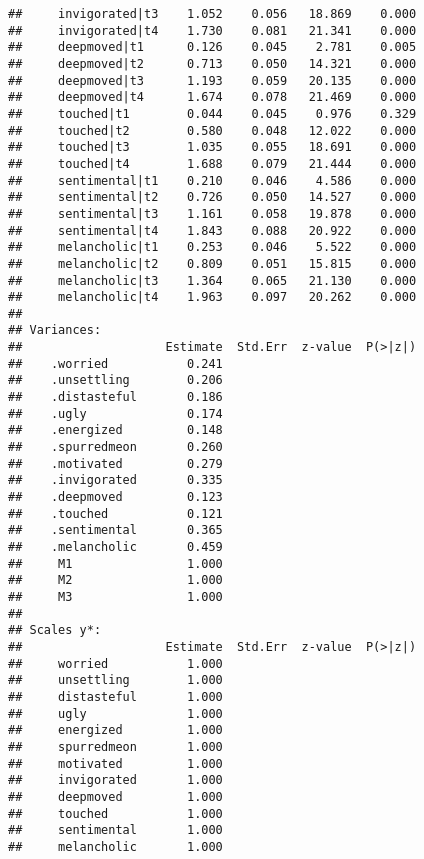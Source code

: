 \documentclass[
]{article}
\begin{document}
\begin{verbatim}
##     invigorated|t3    1.052    0.056   18.869    0.000
##     invigorated|t4    1.730    0.081   21.341    0.000
##     deepmoved|t1      0.126    0.045    2.781    0.005
##     deepmoved|t2      0.713    0.050   14.321    0.000
##     deepmoved|t3      1.193    0.059   20.135    0.000
##     deepmoved|t4      1.674    0.078   21.469    0.000
##     touched|t1        0.044    0.045    0.976    0.329
##     touched|t2        0.580    0.048   12.022    0.000
##     touched|t3        1.035    0.055   18.691    0.000
##     touched|t4        1.688    0.079   21.444    0.000
##     sentimental|t1    0.210    0.046    4.586    0.000
##     sentimental|t2    0.726    0.050   14.527    0.000
##     sentimental|t3    1.161    0.058   19.878    0.000
##     sentimental|t4    1.843    0.088   20.922    0.000
##     melancholic|t1    0.253    0.046    5.522    0.000
##     melancholic|t2    0.809    0.051   15.815    0.000
##     melancholic|t3    1.364    0.065   21.130    0.000
##     melancholic|t4    1.963    0.097   20.262    0.000
## 
## Variances:
##                    Estimate  Std.Err  z-value  P(>|z|)
##    .worried           0.241                           
##    .unsettling        0.206                           
##    .distasteful       0.186                           
##    .ugly              0.174                           
##    .energized         0.148                           
##    .spurredmeon       0.260                           
##    .motivated         0.279                           
##    .invigorated       0.335                           
##    .deepmoved         0.123                           
##    .touched           0.121                           
##    .sentimental       0.365                           
##    .melancholic       0.459                           
##     M1                1.000                           
##     M2                1.000                           
##     M3                1.000                           
## 
## Scales y*:
##                    Estimate  Std.Err  z-value  P(>|z|)
##     worried           1.000                           
##     unsettling        1.000                           
##     distasteful       1.000                           
##     ugly              1.000                           
##     energized         1.000                           
##     spurredmeon       1.000                           
##     motivated         1.000                           
##     invigorated       1.000                           
##     deepmoved         1.000                           
##     touched           1.000                           
##     sentimental       1.000                           
##     melancholic       1.000
\end{verbatim}
\end{document}
